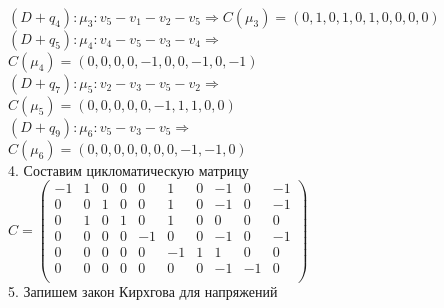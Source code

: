 \documentclass{article}
\begin{document}
\vspace{3mm}
\\
\hspace*{8mm} $(D + q_4): \mu_3: v_5 - v_1 - v_2 - v_5\Rightarrow C(\mu_3) = (0, 1, 0, 1, 0, 1, 0, 0, 0, 0)$
\vspace{3mm}
\\
\hspace*{8mm} $(D + q_5): \mu_4: v_4 - v_5 - v_3 - v_4\Rightarrow$
\vspace{3mm}
\\
\hspace*{12mm}
$C(\mu_4)= (0, 0, 0, 0, -1, 0, 0, -1, 0, -1)$
\vspace{5mm}
\\ 
\hspace*{8mm} $(D + q_7): \mu_5: v_2 - v_3 - v_5 - v_2\Rightarrow$
\vspace{3mm}
\\
\hspace*{12mm}
$C(\mu_5)= (0, 0, 0, 0, 0, -1, 1, 1, 0, 0)$
\vspace{5mm}
\\
\hspace*{8mm} $(D + q_9): \mu_6: v_5 - v_3 - v_5\Rightarrow$
\vspace{3mm}
\\
\hspace*{12mm}
$C(\mu_6)= (0, 0, 0, 0, 0, 0, 0, -1, -1, 0)$
\vspace{5mm}
\\ 
\hspace*{8mm}4. Составим цикломатическую матрицу
\vspace{5mm}
\\
\hspace*{12mm}
\setcounter{MaxMatrixCols}{20}
$C = 
\begin{pmatrix}
	-1 & 1 & 0 & 0 & 0 & 1 & 0 & -1 & 0 & -1 \\
	0 & 0 & 1 & 0 & 0 & 1 & 0 & -1 & 0 & -1 \\
	0 & 1 & 0 & 1 & 0 & 1 & 0 & 0 & 0 & 0 \\
	0 & 0 & 0 & 0 & -1 & 0 & 0 & -1 & 0 & -1 \\
    0 & 0 & 0 & 0 & 0 & -1 & 1 & 1 & 0 & 0 \\
	0 & 0 & 0 & 0 & 0 & 0 & 0 & -1 & -1 & 0 \\ 
\end{pmatrix}
$
\vspace{5mm}
\\ 
\hspace*{8mm}5. Запишем закон Кирхгова для напряжений
\end{document}
